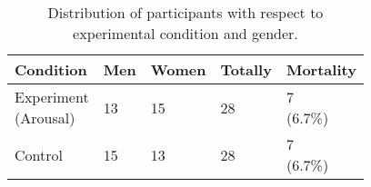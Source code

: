 


\begin{table*}
  \small
  \centering
  \begin{tabularx}{0.6\textwidth}{XXXXX}
    \toprule
    Condition & Men & Women & Totally & Mortality \\ 
    \midrule
    \cellcontent{Experiment\\(Arousal)} & 13 & 15 & 28
    & \cellcontent{7\\(6.7\%)} \\
    Control & 15 & 13 & 28
    & \cellcontent{7\\(6.7\%)} \\
    \bottomrule
  \end{tabularx}
  \caption{Distribution of participants with respect to experimental
    condition and gender.}
  \label{table:participants}
\end{table*}








